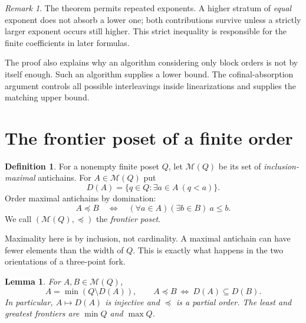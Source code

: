 \documentclass[11pt,a4paper]{article}
\newtheorem{lemma}[theorem]{Lemma}
\theoremstyle{definition}
\newtheorem{definition}[theorem]{Definition}
\theoremstyle{remark}
\newtheorem{remark}[theorem]{Remark}
\newcommand{\M}{\mathcal M}
\begin{document}
\begin{remark}
The theorem permits repeated exponents. A higher stratum of \emph{equal}
exponent does not absorb a lower one; both contributions survive unless a
strictly larger exponent occurs still higher. This strict inequality is
responsible for the finite coefficients in later formulas.
\end{remark}

The proof also explains why an algorithm considering only block orders is
not by itself enough. Such an algorithm supplies a lower bound. The
cofinal-absorption argument controls all possible interleavings inside
linearizations and supplies the matching upper bound.

\section{The frontier poset of a finite order}\label{sec:frontiers}

\begin{definition}
For a nonempty finite poset $Q$, let $\M(Q)$ be its set of
\emph{inclusion-maximal} antichains. For $A\in\M(Q)$ put
\[
 D(A)=\{q\in Q:\exists a\in A\ (q<a)\}.
\]
Order maximal antichains by domination:
\begin{equation}\label{eq:frontierorder}
 A\preceq B\quad\Longleftrightarrow\quad
 (\forall a\in A)(\exists b\in B)\ a\le b.
\end{equation}
We call $(\M(Q),\preceq)$ the \emph{frontier poset}.
\end{definition}

Maximality here is by inclusion, not cardinality. A maximal antichain can
have fewer elements than the width of $Q$. This is exactly what happens
in the two orientations of a three-point fork.

\begin{lemma}\label{lem:frontiers}
For $A,B\in\M(Q)$,
\begin{equation}\label{eq:frontierD}
 A=\min(Q\setminus D(A)),
 \qquad
 A\preceq B\ \Longleftrightarrow\ D(A)\subseteq D(B).
\end{equation}
In particular, $A\mapsto D(A)$ is injective and $\preceq$ is a partial
order. The least and greatest frontiers are $\min Q$ and $\max Q$.
\end{lemma}
\end{document}
